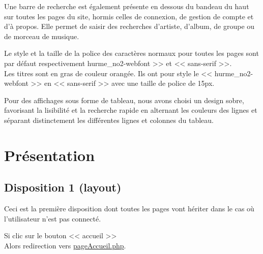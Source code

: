 \newpage

	\begin{paragraphe}
		Une barre de recherche est également présente en dessous du bandeau du haut sur toutes les pages du site, hormis celles de connexion, de gestion de compte et d'à propos.
		Elle permet de saisir des recherches d'artiste, d'album, de groupe ou de morceau de musique.
	\end{paragraphe}

	\begin{paragraphe}
		Le style et la taille de la police des caractères normaux pour toutes les pages sont par défaut respectivement \og hurme\_no2-webfont >> et << sans-serif >>.\\
		Les titres sont en gras de couleur orangée. Ils ont pour style le << hurme\_no2-webfont >> en << sans-serif >> avec une taille de police de 15px.
    \end{paragraphe}


    \begin{paragraphe}
       Pour des affichages sous forme de tableau, nous avons choisi un design sobre, favorisant la lisibilité et la recherche rapide en alternant les couleurs des lignes
       et séparant distinctement les différentes lignes et colonnes du tableau.
    \end{paragraphe}

\newpage

\section{Présentation}
	\subsection{Disposition 1 (layout)}

		\begin{paragraphe}
			Ceci est la première disposition dont toutes les pages vont hériter dans le cas où l'utilisateur n'est pas connecté.
		\end{paragraphe}

		\begin{paragraphe}
			Si clic sur le bouton << accueil >> \\
			Alors redirection vers \underline{pageAccueil.php}.
		\end{paragraphe}

